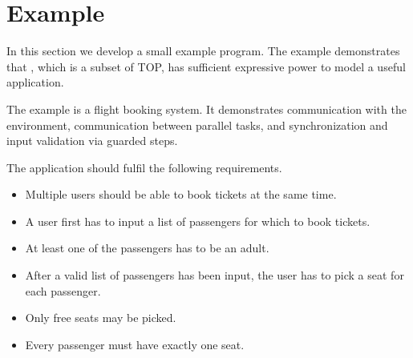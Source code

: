 
\section{Example}

In this section we develop a small example program.
The example demonstrates that \tophat, which is a subset of TOP, has sufficient expressive power to model a useful application.

The example is a flight booking system.
It demonstrates communication with the environment, communication between parallel tasks, and synchronization and input validation via guarded steps.

The application should fulfil the following requirements.
\begin{itemize}
\item Multiple users should be able to book tickets at the same time.
\item A user first has to input a list of passengers for which to book tickets.
\item At least one of the passengers has to be an adult.
\item After a valid list of passengers has been input, the user has to pick a seat for each passenger.
\item Only free seats may be picked.
\item Every passenger must have exactly one seat.
\end{itemize}
